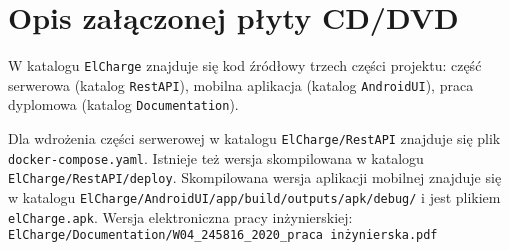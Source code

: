 \chapter{Opis załączonej płyty CD/DVD}
W katalogu \texttt{ElCharge} znajduje się kod źródłowy trzech części projektu: część serwerowa (katalog \texttt{RestAPI}), mobilna aplikacja (katalog \texttt{AndroidUI}), praca dyplomowa (katalog \texttt{Documentation}).

Dla wdrożenia części serwerowej w katalogu \texttt{ElCharge/RestAPI} znajduje się plik \texttt{docker-compose.yaml}. Istnieje też wersja skompilowana w katalogu \texttt{ElCharge/RestAPI/deploy}.
Skompilowana wersja aplikacji mobilnej znajduje się w katalogu \texttt{ElCharge/AndroidUI/app/build/outputs/apk/debug/} i jest plikiem \texttt{elCharge.apk}.
Wersja elektroniczna pracy inżynierskiej: \texttt{ElCharge/Documentation/W04\_245816\_2020\_praca inżynierska.pdf}
